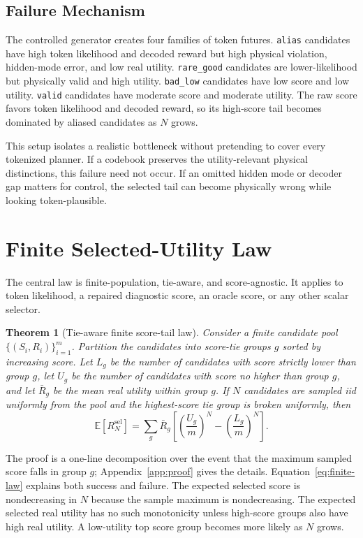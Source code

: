\documentclass{article}
\newcommand{\sel}{\mathrm{sel}}
\newtheorem{theorem}{Theorem}
\begin{document}
\subsection{Failure Mechanism}

The controlled generator creates four families of token futures. \texttt{alias} candidates have high token likelihood and decoded reward but high physical violation, hidden-mode error, and low real utility. \texttt{rare\_good} candidates are lower-likelihood but physically valid and high utility. \texttt{bad\_low} candidates have low score and low utility. \texttt{valid} candidates have moderate score and moderate utility. The raw score favors token likelihood and decoded reward, so its high-score tail becomes dominated by aliased candidates as $N$ grows.

This setup isolates a realistic bottleneck without pretending to cover every tokenized planner. If a codebook preserves the utility-relevant physical distinctions, this failure need not occur. If an omitted hidden mode or decoder gap matters for control, the selected tail can become physically wrong while looking token-plausible.

\section{Finite Selected-Utility Law}
\label{sec:law}

The central law is finite-population, tie-aware, and score-agnostic. It applies to token likelihood, a repaired diagnostic score, an oracle score, or any other scalar selector.

\begin{theorem}[Tie-aware finite score-tail law]
Consider a finite candidate pool $\{(S_i,R_i)\}_{i=1}^m$. Partition the candidates into score-tie groups $g$ sorted by increasing score. Let $L_g$ be the number of candidates with score strictly lower than group $g$, let $U_g$ be the number of candidates with score no higher than group $g$, and let $\bar R_g$ be the mean real utility within group $g$. If $N$ candidates are sampled iid uniformly from the pool and the highest-score tie group is broken uniformly, then
\begin{equation}
\mathbb{E}[R^{\sel}_N]
= \sum_g \bar R_g
\left[
\left(\frac{U_g}{m}\right)^N
- \left(\frac{L_g}{m}\right)^N
\right].
\label{eq:finite-law}
\end{equation}
\end{theorem}

The proof is a one-line decomposition over the event that the maximum sampled score falls in group $g$; Appendix~\ref{app:proof} gives the details. Equation~\ref{eq:finite-law} explains both success and failure. The expected selected score is nondecreasing in $N$ because the sample maximum is nondecreasing. The expected selected real utility has no such monotonicity unless high-score groups also have high real utility. A low-utility top score group becomes more likely as $N$ grows.
\end{document}

